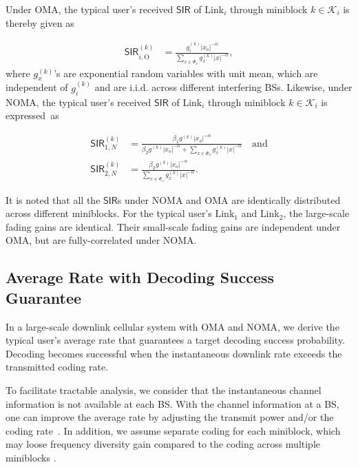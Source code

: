 \documentclass[conference]{IEEEtran}
\def\SIR{\mathsf{SIR}}
\def\OMA{\text{O}}
\def\L{\text{Link}}
\begin{document}
Under OMA, the typical user's received $\SIR$ of $\L_i$ through miniblock $k\in\mathcal{K}_i$ is thereby given as

\vspace{-10pt}\small\begin{align}
\SIR_{i,\OMA}^{(k)} &= \frac{ g_{i}^{(k)} |x_o|^{-\alpha}}{  \sum_{x\in\Phi_o } g_{x}^{(k)} |x|^{-\alpha} }, \label{Eq:SIR_OMA}
\end{align}\normalsize
where $g_{x}^{(k)}$'s are exponential random variables with unit mean, which are independent of $g_{i}^{(k)}$ and are i.i.d. across  different interfering BSs. Likewise, under NOMA, the typical user's received $\SIR$ of $\L_i$ through miniblock $k\in\mathcal{K}_i$ is expressed~as

\vspace{-10pt}\small\begin{align}
\SIR_{1,N}^{(k)} &= \frac{\beta_1   g^{(k)} |x_o|^{-\alpha}}{\beta_2  g^{(k)} |x_o|^{-\alpha} + \sum_{x\in\Phi_o } g_{x}^{(k)} |x|^{-\alpha} } \quad\text{and} \label{Eq:SIR1_NOMA}\\ 
\SIR_{2,N}^{(k)}&= \frac{\beta_2   g^{(k)} |x_o|^{-\alpha}}{\sum_{x\in\Phi_o } g_{x}^{(k)} |x|^{-\alpha}}. \label{Eq:SIR2_NOMA}
\end{align}\normalsize 

It is noted that all the $\SIR$s under NOMA and OMA are identically distributed across different miniblocks. For the typical user's $\L_1$  and $\L_2$, the large-scale fading gains are identical. Their small-scale fading gains are independent under OMA, but are fully-correlated under NOMA.



\subsection{Average Rate with Decoding Success Guarantee}
In a large-scale downlink cellular system with OMA and NOMA, we derive the typical user's average rate that guarantees a target decoding success probability. Decoding becomes successful when the instantaneous downlink rate exceeds the transmitted coding rate. 

To facilitate tractable analysis, we consider that the instantaneous channel information is not available at each BS. With the channel information at a BS, one can improve the average rate by adjusting the transmit power \cite{Petar5G:18} and/or the coding rate~\cite{Andrews:2011bg,JHParkTWC:15}. In addition, we assume separate coding for each miniblock, which may loose frequency diversity gain compared to the coding across multiple miniblocks \cite{Petar5G:18,TseBook:FundamaentalsWC:2005}. 
\end{document}
